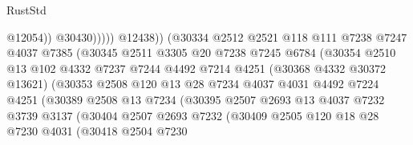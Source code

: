 \begin{lexlean}{RustStd}
\begin{coremodule}
                                          @12054))
                                      @30430)))))
                            @12438))
                        (@30334
                          @2512
                          @2521
                          @118
                          @111
                          @7238
                          @7247
                          @4037
                          @7385
                          (@30345
                            @2511
                            @3305
                            @20
                            @7238
                            @7245
                            @6784
                            (@30354
                              @2510
                              @13
                              @102
                              @4332
                              @7237
                              @7244
                              @4492
                              @7214
                              @4251
                              (@30368 @4332 @30372 @13621)
                              (@30353
                                @2508
                                @120
                                @13
                                @28
                                @7234
                                @4037
                                @4031
                                @4492
                                @7224
                                @4251
                                (@30389
                                  @2508
                                  @13
                                  @7234
                                  (@30395
                                    @2507
                                    @2693
                                    @13
                                    @4037
                                    @7232
                                    @3739
                                    @3137
                                    (@30404
                                      @2507
                                      @2693
                                      @7232
                                      (@30409
                                        @2505
                                        @120
                                        @18
                                        @28
                                        @7230
                                        @4031
                                        (@30418
                                          @2504
                                          @7230

\end{coremodule}
\end{lexlean}
